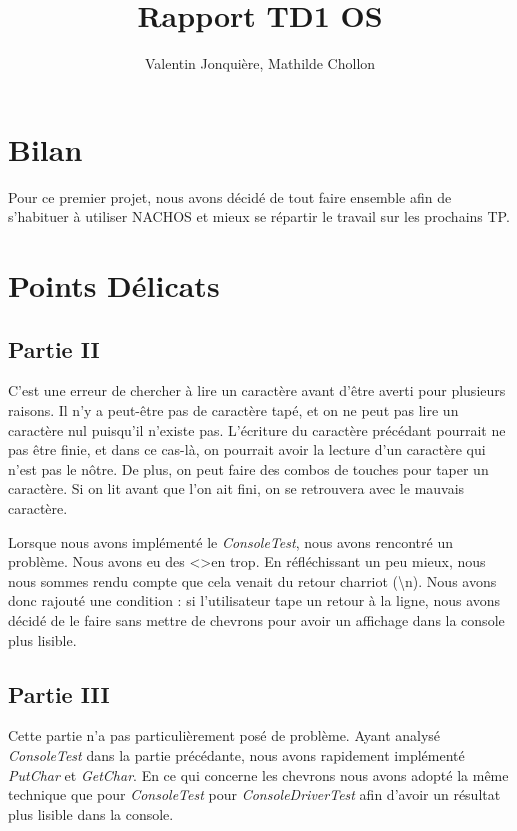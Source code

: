 \documentclass{article}
\author{
    Valentin Jonquière,
    Mathilde Chollon
}
\title{Rapport TD1 OS}
\begin{document}
\maketitle

\pagebreak

\tableofcontents

\pagebreak

\section{Bilan}

Pour ce premier projet, nous avons décidé de tout faire ensemble afin de
s'habituer à utiliser NACHOS et mieux se répartir le travail sur les prochains
TP.

\section{Points Délicats}
\subsection{Partie II}
C'est une erreur de chercher à lire un caractère avant d'être averti pour
plusieurs raisons. Il n'y a peut-être pas de caractère tapé, et on ne peut pas
lire un caractère nul puisqu'il n'existe pas. L'écriture du caractère précédant
pourrait ne pas être finie, et dans ce cas-là, on pourrait avoir la lecture
d'un caractère qui n'est pas le nôtre. De plus, on peut faire des combos de
touches pour taper un caractère. Si on lit avant que l'on ait fini, on se
retrouvera avec le mauvais caractère.

Lorsque nous avons implémenté le \textit{ConsoleTest}, nous avons rencontré un
problème. Nous avons eu des \textless \textgreater en trop. En réfléchissant un
peu mieux, nous nous sommes rendu compte que cela venait du retour charriot
(\textbackslash n). Nous avons donc rajouté une condition : si l'utilisateur
tape un retour à la ligne, nous avons décidé de le faire sans mettre de
chevrons pour avoir un affichage dans la console plus lisible.

\subsection{Partie III}
Cette partie n'a pas particulièrement posé de problème. Ayant analysé
\textit{ConsoleTest} dans la partie précédante, nous avons rapidement
implémenté \textit{PutChar} et \textit{GetChar}. En ce qui concerne les
chevrons nous avons adopté la même technique que pour \textit{ConsoleTest} pour
\textit{ConsoleDriverTest} afin d'avoir un résultat plus lisible dans la
console.
\end{document}
